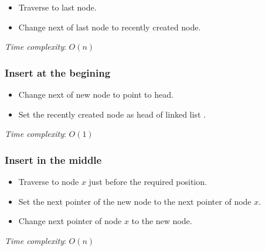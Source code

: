 \documentclass[a4paper,11pt]{book}
\begin{document}
\begin{itemize}
	\item Traverse to last node.
	\item Change next of last node to recently created node.
\end{itemize}
\noindent \textit{Time complexity}: $O(n)$

\subsubsection{Insert at the begining}

\begin{itemize}
	\item Change next of new node to point to head.
	\item Set the recently created node as head of linked list .
\end{itemize}
\noindent \textit{Time complexity}: $O(1)$

\subsubsection{Insert in the middle}

\begin{itemize}
	\item Traverse to node $x$ just before the required position.
	\item Set the next pointer of the new node to the next pointer of node $x$.
	\item Change next pointer of node $x$ to the new node.
\end{itemize}
\noindent \textit{Time complexity}: $O(n)$
\end{document}

